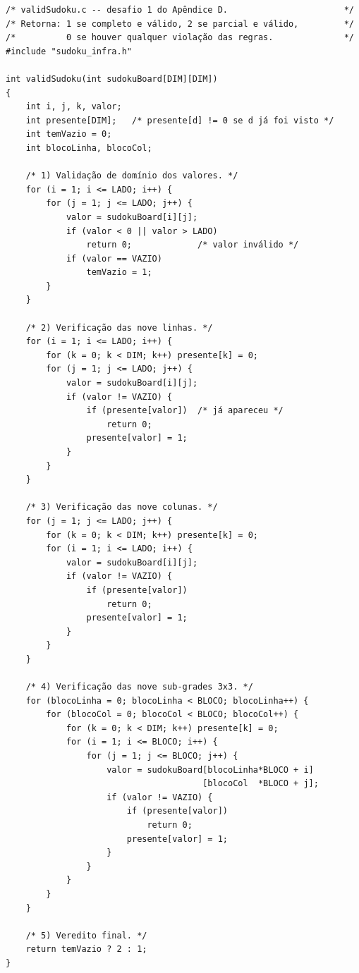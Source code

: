 \documentclass[11pt,a4paper,oneside]{report}
\begin{document}
\begin{lstlisting}[caption={Implementação completa da função \texttt{validSudoku}.},label={lst:valid}]
/* validSudoku.c -- desafio 1 do Apêndice D.                       */
/* Retorna: 1 se completo e válido, 2 se parcial e válido,         */
/*          0 se houver qualquer violação das regras.              */
#include "sudoku_infra.h"

int validSudoku(int sudokuBoard[DIM][DIM])
{
    int i, j, k, valor;
    int presente[DIM];   /* presente[d] != 0 se d já foi visto */
    int temVazio = 0;
    int blocoLinha, blocoCol;

    /* 1) Validação de domínio dos valores. */
    for (i = 1; i <= LADO; i++) {
        for (j = 1; j <= LADO; j++) {
            valor = sudokuBoard[i][j];
            if (valor < 0 || valor > LADO)
                return 0;             /* valor inválido */
            if (valor == VAZIO)
                temVazio = 1;
        }
    }

    /* 2) Verificação das nove linhas. */
    for (i = 1; i <= LADO; i++) {
        for (k = 0; k < DIM; k++) presente[k] = 0;
        for (j = 1; j <= LADO; j++) {
            valor = sudokuBoard[i][j];
            if (valor != VAZIO) {
                if (presente[valor])  /* já apareceu */
                    return 0;
                presente[valor] = 1;
            }
        }
    }

    /* 3) Verificação das nove colunas. */
    for (j = 1; j <= LADO; j++) {
        for (k = 0; k < DIM; k++) presente[k] = 0;
        for (i = 1; i <= LADO; i++) {
            valor = sudokuBoard[i][j];
            if (valor != VAZIO) {
                if (presente[valor])
                    return 0;
                presente[valor] = 1;
            }
        }
    }

    /* 4) Verificação das nove sub-grades 3x3. */
    for (blocoLinha = 0; blocoLinha < BLOCO; blocoLinha++) {
        for (blocoCol = 0; blocoCol < BLOCO; blocoCol++) {
            for (k = 0; k < DIM; k++) presente[k] = 0;
            for (i = 1; i <= BLOCO; i++) {
                for (j = 1; j <= BLOCO; j++) {
                    valor = sudokuBoard[blocoLinha*BLOCO + i]
                                       [blocoCol  *BLOCO + j];
                    if (valor != VAZIO) {
                        if (presente[valor])
                            return 0;
                        presente[valor] = 1;
                    }
                }
            }
        }
    }

    /* 5) Veredito final. */
    return temVazio ? 2 : 1;
}
\end{lstlisting}
\end{document}
